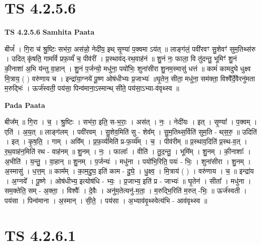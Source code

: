 \documentclass[17pt]{extarticle}
\begin{document}
\section*{ TS 4.2.5.6 }

\textbf{TS 4.2.5.6 } \newline
\textbf{Samhita Paata} \newline

बीजं᳚ । गि॒रा च॑ श्रु॒ष्टिः सभ॑रा॒ अस॑न्नो॒ नेदी॑य॒ इथ् सृ॒ण्या॑ प॒क्वमा ऽय॑त् ॥ लाङ्ग॑लं॒ पवी॑रवꣳ सु॒शेवꣳ॑ सुम॒तिथ्स॑रु । उदित् कृ॑षति॒ गामविं॑ प्रफ॒र्व्यं॑ च॒ पीव॑रीं । प्र॒स्थाव॑द्-रथ॒वाह॑नं ॥ शु॒नं नः॒ फाला॒ वि तु॑दन्तु॒ भूमिꣳ॑ शु॒नं की॒नाशा॑ अ॒भि य॑न्तु वा॒हान् । शु॒नं प॒र्जन्यो॒ मधु॑ना॒ पयो॑भिः॒ शुना॑सीरा शु॒नम॒स्मासु॑ धत्तं ॥ कामं॑ कामदुघे धुक्ष्व मि॒त्राय॒ ( ) वरु॑णाय च । इन्द्रा॑या॒ग्नये॑ पू॒ष्ण ओष॑धीभ्यः प्र॒जाभ्यः॑ ॥घृ॒तेन॒ सीता॒ मधु॑ना॒ सम॑क्ता॒ विश्वै᳚र्दे॒वैरनु॑मता म॒रुद्भिः॑ । ऊर्ज॑स्वती॒ पय॑सा॒ पिन्व॑माना॒ऽस्मान्थ् सी॑ते॒ पय॑सा॒ऽभ्या-व॑वृथ्स्व ॥ \newline

\textbf{Pada Paata} \newline

बीज᳚म् ॥ गि॒रा । च॒ । श्रु॒ष्टिः । सभ॑रा॒ इति॒ स-भ॒राः॒ । अस॑त् । नः॒ । नेदी॑यः । इत् । सृ॒ण्या᳚ । प॒क्वम् । एति॑ । अ॒य॒त् ॥ लाङ्ग॑लम् । पवी॑रवम् । सु॒शेव॒मिति॑ सु - शेव᳚म् । सु॒म॒तिथ्स॒र्विति॑ सुम॒ति - थ्‌स॒रु॒ ॥ उदिति॑ । इत् । कृ॒ष॒ति॒ । गाम् । अवि᳚म् । प्र॒फ॒र्व्य॑मिति॑ प्र-फ॒र्व्य᳚म् । च॒ । पीव॑रीम् ॥ प्र॒स्थाव॒दिति॑ प्र॒स्थ-व॒त् । र॒थ॒वाह॑न॒मिति॑ रथ - वाह॑नम् ॥ शु॒नम् । नः॒ । फालाः᳚ । वीति॑ । तु॒द॒न्तु॒ । भूमि᳚म् । शु॒नम् । की॒नाशाः᳚ । अ॒भीति॑ । य॒न्तु॒ । वा॒हान् ॥ शु॒नम् । प॒र्जन्यः॑ । मधु॑ना । पयो॑भि॒रिति॒ पयः॑ - भिः॒ । शुना॑सीरा । शु॒नम् । अ॒स्मासु॑ । ध॒त्त॒म् ॥ काम᳚म् । का॒म॒दु॒घ॒ इति॑ काम - दु॒घे॒ । धु॒क्ष्व॒ । मि॒त्राय॑ ( ) । वरु॑णाय । च॒ ॥ इन्द्रा॑य । अ॒ग्नये᳚ । पू॒ष्णे । ओष॑धीभ्य॒ इत्योष॑धि - भ्यः॒ । प्र॒जाभ्य॒ इति॑ प्र - जाभ्यः॑ ॥ घृ॒तेन॑ । सीता᳚ । मधु॑ना । सम॒क्तेति॒ सम् - अ॒क्ता॒ । विश्वैः᳚ । दे॒वैः । अनु॑म॒तेत्यनु॑-म॒ता॒ । म॒रुद्भि॒रिति॑ म॒रुत् -भिः॒ ॥ ऊर्ज॑स्वती । पय॑सा । पिन्व॑माना । अ॒स्मान् । सी॒ते॒ । पय॑सा । अ॒भ्याव॑वृ॒थ्स्वेत्य॑भि - आव॑वृथ्स्व ॥  \newline




\section*{ TS 4.2.6.1 }
\end{document}
